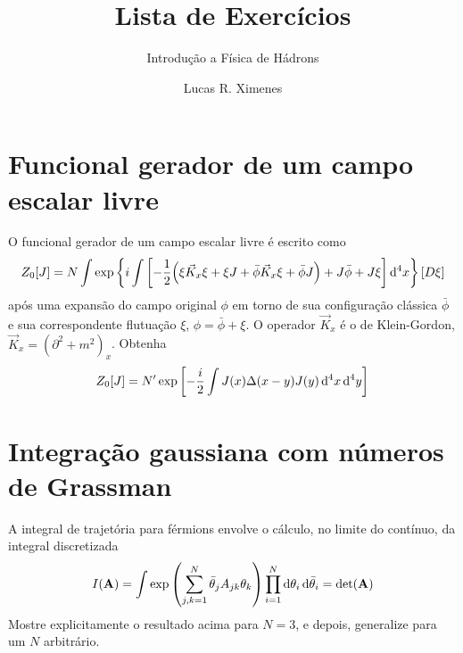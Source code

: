 \documentclass[a4paper, 11pt, oneside]{impression}
\title{Lista de Exercícios} %
\subtitle{Introdução a Física de Hádrons} %
\author{Lucas R. Ximenes} %
\begin{document}
\maketitle

\chapter{Funcional gerador de um campo escalar livre}\label{quest: one}

\begin{exercise}{}
    O funcional gerador de um campo escalar livre é escrito como
        \begin{equation*}
            Z_{0}[J] = N \int \exp\qty{
                i \int \qty[
                    -\dfrac{1}{2}\qty(
                        \xi\vec{K}_{x}\xi +
                        \xi J +
                        \bar{\phi}\vec{K}_{x}\xi + 
                        \bar{\phi}J
                    ) + 
                    J\bar{\phi} + 
                    J\xi
                ]\dd[4]{x}
            }[D\xi]
        \end{equation*}
    após uma expansão do campo original $\phi$ em torno de sua configuração clássica $\bar{\phi}$ e sua correspondente flutuação $\xi$, $\phi = \bar{\phi} + \xi$. O operador $\vec{K}_{x}$ é o de Klein-Gordon, $\vec{K}_{x} = (\partial^{2} + m^{2})_{x}$. Obtenha
        \begin{equation*}
            Z_{0}[J] = N'\exp\qty[
                -\dfrac{i}{2}\int J(x)\Delta(x-y)J(y)\dd[4]{x}\dd[4]{y}
            ]
        \end{equation*}
\end{exercise}



\newpage

\chapter{Integração gaussiana com números de Grassman}\label{quest: two}

\begin{exercise}{}
    A integral de trajetória para férmions envolve o cálculo, no limite do contínuo, da integral discretizada
        \begin{equation*}
            I(\vb{A}) = \int \exp\qty(\sum_{j,k=1}^{N}\bar{\theta}_{j}A_{jk}\theta_{k})\prod_{i=1}^{N}\dd{\theta_{i}}\dd{\bar{\theta}_{i}} = \text{det}(\vb{A})
        \end{equation*}
    Mostre explicitamente o resultado acima para $N = 3$, e depois, generalize para um $N$ arbitrário.
\end{exercise}
\end{document}
